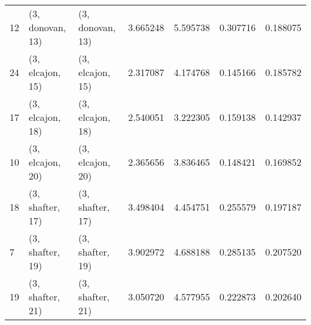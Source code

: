 \begin{tabular}{lllrrrr}
12 &  (3, donovan, 13) &  (3, donovan, 13) &  3.665248 &  5.595738 &   0.307716 &  0.188075 \\
24 &  (3, elcajon, 15) &  (3, elcajon, 15) &  2.317087 &  4.174768 &   0.145166 &  0.185782 \\
17 &  (3, elcajon, 18) &  (3, elcajon, 18) &  2.540051 &  3.222305 &   0.159138 &  0.142937 \\
10 &  (3, elcajon, 20) &  (3, elcajon, 20) &  2.365656 &  3.836465 &   0.148421 &  0.169852 \\
18 &  (3, shafter, 17) &  (3, shafter, 17) &  3.498404 &  4.454751 &   0.255579 &  0.197187 \\
7  &  (3, shafter, 19) &  (3, shafter, 19) &  3.902972 &  4.688188 &   0.285135 &  0.207520 \\
19 &  (3, shafter, 21) &  (3, shafter, 21) &  3.050720 &  4.577955 &   0.222873 &  0.202640 \\
\bottomrule
\end{tabular}
